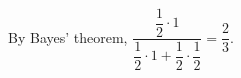 By Bayes' theorem, $\dfrac{\dfrac12\cdot1}{\dfrac12\cdot1+\dfrac12\cdot\dfrac12}=\boxed{\dfrac23}$.
